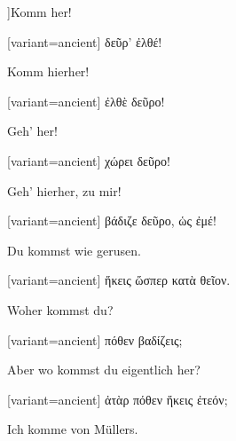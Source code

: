 ]\indent Komm her!

\switchcolumn

\begin{greek}[variant=ancient]%
δεῦρ' ἐλθέ!

\end{greek}%
\switchcolumn*

Komm hierher!

\switchcolumn

\begin{greek}[variant=ancient]%
ἐλθὲ δεῦρο!

\end{greek}%
\switchcolumn*

Geh' her!

\switchcolumn

\begin{greek}[variant=ancient]%
χώρει δεῦρο!

\end{greek}%
\switchcolumn*

Geh' hierher, zu mir!

\switchcolumn

\begin{greek}[variant=ancient]%
βάδιζε δεῦρο, ὡς ἐμέ!

\end{greek}%
\switchcolumn*

Du kommst wie gerusen.

\switchcolumn

\begin{greek}[variant=ancient]%
ἥκεις ὥσπερ κατὰ θεῖον.

\end{greek}%
\switchcolumn*

Woher kommst du?

\switchcolumn

\begin{greek}[variant=ancient]%
πόθεν βαδίζεις;

\end{greek}%
\switchcolumn*

Aber wo kommst du eigentlich her?

\switchcolumn

\begin{greek}[variant=ancient]%
ἀτὰρ πόθεν ἥκεις ἐτεόν;

\end{greek}%
\switchcolumn*

Ich komme von Müllers.

\switchcolumn

